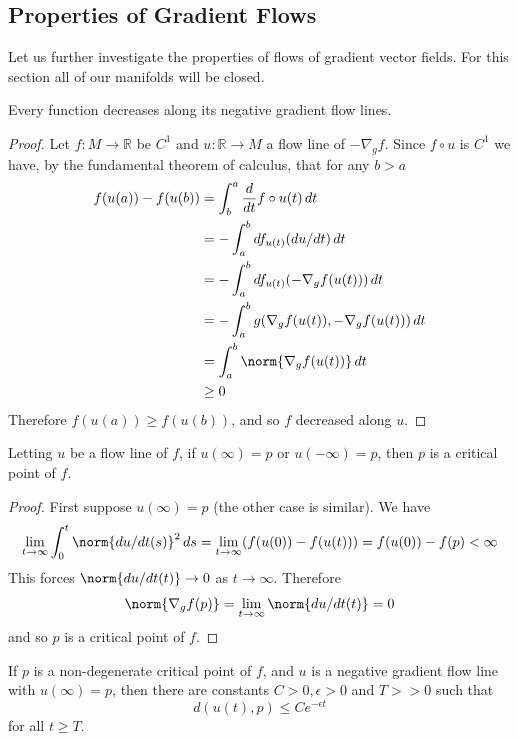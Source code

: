 \subsection{Properties of Gradient Flows}
\label{Properties of Gradient Flows}


Let us further investigate the properties of flows of gradient vector fields. For this section all of our manifolds will be closed.
\begin{prop}
\label{decrease along negative gradient flow line}
Every function decreases along its negative gradient flow lines.
\end{prop}
\begin{proof}
Let $f : M \rightarrow \mathbb R$ be $C^1$ and $u : \mathbb R \rightarrow M$ a flow line of $-\nabla_g f$. Since $f \circ u$ is $C^1$ we have, by the fundamental theorem of calculus, that for any $b>a$
\begin{align*}
	f(u(a))-f(u(b)) &= \int_b^a \frac{d}{dt} f \circ u(t) \, dt \\
	                &= -\int_a^b df_{u(t)} (du/dt) \, dt \\
	                &= -\int_a^b df_{u(t)} (-\nabla_g f(u(t))) \, dt \\
	                &= -\int_a^b g(\nabla_g f(u(t)),-\nabla_g f(u(t))) \, dt \\
	                &= \int_a^b \norm{\nabla_g f(u(t))} \, dt \\
	                &\geq 0
\end{align*}
Therefore $f(u(a)) \geq f(u(b))$, and so $f$ decreased along $u$.
\end{proof}

\begin{prop}
Letting $u$ be a flow line of $f$, if $u(\infty)=p$ or $u(-\infty)=p$, then $p$ is a critical point of $f$.
\end{prop}
\begin{proof}
First suppose $u(\infty)=p$ (the other case is similar). We have
\[ \lim_{t \to \infty} \int_0^t \norm{du/dt(s)}^2 \, ds = \lim_{t \to \infty} (f(u(0)) - f(u(t))) = f(u(0)) - f(p) < \infty \]
This forces $\norm{du/dt(t)} \to 0$ as $t \to \infty$. Therefore
\[ \norm{\nabla_g f(p)} = \lim_{t \to \infty} \norm{du/dt(t)} = 0 \]
and so $p$ is a critical point of $f$.
\end{proof}

\begin{prop}
If $p$ is a non-degenerate critical point of $f$, and $u$ is a negative gradient flow line with $u(\infty)=p$, then there are constants $C>0, \epsilon>0$ and $T >> 0$ such that
\[ d(u(t),p) \leq Ce^{-\epsilon t} \]
for all $t \geq T$.
\end{prop}





